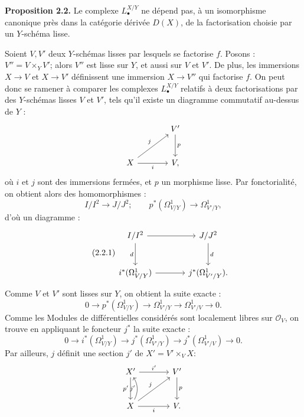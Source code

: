 \documentclass[11pt]{article}
\begin{document}
\textbf{Proposition 2.2.} Le complexe $L^{X/Y}_\bullet$ ne dépend pas, à un isomorphisme canonique près dans la catégorie dérivée $D(X)$, de la factorisation choisie par un $Y$-schéma lisse.

Soient $V,V'$ deux $Y$-schémas lisses par lesquels se factorise $f$. Posons : $V''=V\times_Y V'$; alors $V''$ est lisse sur $Y$, et aussi sur $V$ et $V'$. De plus, les immersions $X\to V$ et $X\to V'$ définissent une immersion $X\to V''$ qui factorise $f$. On peut donc se ramener à comparer les complexes $L^{X/Y}_\bullet$ relatifs à deux factorisations par des $Y$-schémas lisses $V$ et $V'$, tels qu'il existe un diagramme commutatif au-dessus de $Y$ :
\[
\begin{tikzcd}[column sep=large,row sep=large]
& V' \arrow[d,"p"]\\
X \arrow[ur,"j"] \arrow[r,"i"'] & V,
\end{tikzcd}
\]
où $i$ et $j$ sont des immersions fermées, et $p$ un morphisme lisse. Par fonctorialité, on obtient alors des homomorphismes :
\[
I/I^2\longrightarrow J/J^2;
\qquad
p^*(\Omega^1_{V/Y})\longrightarrow\Omega^1_{V'/Y},
\]
d'où un diagramme :
\begin{equation}\tag{2.2.1}
\begin{tikzcd}[column sep=large,row sep=large]
I/I^2 \arrow[r] \arrow[d,"d"'] & J/J^2 \arrow[d,"d"]\\
i^*(\Omega^1_{V/Y}) \arrow[r] & j^*(\Omega^1_{V'/Y}).
\end{tikzcd}
\end{equation}
Comme $V$ et $V'$ sont lisses sur $Y$, on obtient la suite exacte :
\[
0\longrightarrow p^*(\Omega^1_{V/Y})\longrightarrow\Omega^1_{V'/Y}
\longrightarrow\Omega^1_{V'/V}\longrightarrow0.
\]
Comme les Modules de différentielles considérés sont localement libres sur $\mathcal O_V$, on trouve en appliquant le foncteur $j^*$ la suite exacte :
\begin{equation}\tag{2.2.2}
0\longrightarrow i^*(\Omega^1_{V/Y})\longrightarrow j^*(\Omega^1_{V'/Y})
\longrightarrow j^*(\Omega^1_{V'/V})\longrightarrow0.
\end{equation}
Par
ailleurs, $j$ définit une section $j'$ de $X'=V'\times_V X$:
\[
\begin{tikzcd}[column sep=large,row sep=large]
X' \arrow[r,"i'"] \arrow[d,"p'"'] & V' \arrow[d,"p"]\\
X \arrow[r,"i"'] \arrow[ur,"j"] \arrow[u,"j'",bend right] & V .
\end{tikzcd}
\]
\end{document}
